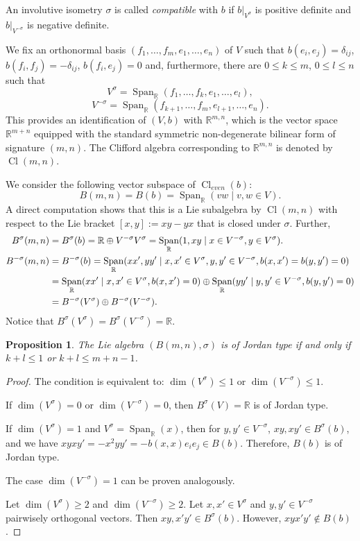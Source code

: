 \documentclass[a4paper,oneside,11pt]{amsart}
\DeclareMathOperator{\Span}{Span}
\DeclareMathOperator{\Cl}{Cl}
\newcommand{\R}{\mathbb R}
\theoremstyle{plain}
\newtheorem{prop}[teo]{Proposition}
\theoremstyle{definition}
\theoremstyle{remark}
\newcommand{\defin}{\emph}
\begin{document}
    An involutive isometry $\sigma$ is called \defin{compatible} with $b$ if $b|_{V^\sigma}$ is positive definite and $b|_{V^{-\sigma}}$ is negative definite.

    We fix an orthonormal basis $(f_1,\dots,f_m,e_1,\dots,e_n)$ of $V$ such that $b(e_i,e_j)=\delta_{ij}$, $b(f_i,f_j)=-\delta_{ij}$, $b(f_i,e_j)=0$ and, furthermore, there are $0\leq k\leq m$, $0\leq l\leq n$ such that 
    $$V^{\sigma}=\Span_\R(f_1,\dots,f_k,e_1,\dots,e_l),$$ $$V^{-\sigma}=\Span_\R(f_{k+1},\dots,f_m,e_{l+1},\dots,e_n).$$This provides an identification of $(V,b)$ with $\R^{m,n}$, which is the vector space $\mathbb R^{m+n}$ equipped with the standard symmetric non-degenerate bilinear form of signature $(m,n)$. The Clifford algebra corresponding to $\R^{m,n}$ is denoted by $\Cl(m,n)$.

    We consider the following vector subspace of $\Cl_{even}(b)$:
    $$B(m,n)=B(b)=\Span_\R(vw \mid v,w\in V).$$
    A direct computation shows that this is a Lie subalgebra by $\Cl(m,n)$ with respect to the Lie bracket $[x,y]:=xy-yx$ that is closed under $\sigma$. Further,
    \begin{align}\label{eq:B^{-sigma}}
    \begin{aligned}
    B^{\sigma}(m,n)& =B^\sigma(b)=\R\oplus V^{-\sigma}V^\sigma=\Span_\R(1, xy \mid x\in V^{-\sigma}, y\in V^{\sigma}).\\
    B^{-\sigma}(m,n)& =B^{-\sigma}(b)=\Span_\R( xx',yy'\mid x,x'\in V^\sigma, y,y'\in V^{-\sigma}, b(x,x')=b(y,y')=0)\\
    & = \Span_\R(xx'\mid x,x'\in V^\sigma, b(x,x')=0)\oplus \Span_\R(yy'\mid y,y'\in V^{-\sigma}, b(y,y')=0)\\
    &=B^{-\sigma}(V^\sigma)\oplus B^{-\sigma}(V^{-\sigma}). 
    \end{aligned}
    \end{align}
    Notice that $B^{\sigma}(V^\sigma)=B^{\sigma}(V^{-\sigma})=\R$.

\begin{prop}\label{semi-Herm1}
The Lie algebra $(B(m,n),\sigma)$ is of Jordan type if and only if $k+l\leq 1$ or $k+l\leq m+n-1$.
\end{prop}

\begin{proof} The condition is equivalent to: $\dim(V^\sigma)\leq 1$ or $\dim(V^{-\sigma})\leq 1$.

If $\dim(V^\sigma)=0$ or  $\dim(V^{-\sigma})=0$, then $B^{\sigma}(V)=\mathbb R$ is of Jordan type.

If $\dim(V^\sigma)=1$ and $V^\sigma=\Span_\R(x)$, then for $y,y'\in V^{-\sigma}$, $xy,xy'\in B^\sigma(b)$, and we have $xyxy'=-x^2yy'=-b(x,x)e_ie_j\in B(b)$. Therefore, $B(b)$ is of Jordan type.

The case  $\dim(V^{-\sigma})=1$ can be proven analogously. 
 
Let $\dim(V^\sigma)\geq 2$ and $\dim(V^{-\sigma})\geq 2$. Let $x,x'\in V^\sigma$ and $y,y'\in V^{-\sigma}$ pairwisely orthogonal vectors. Then $xy,x'y'\in B^\sigma(b)$. However, $xyx'y'\notin B(b)$.
\end{proof}
\end{document}
